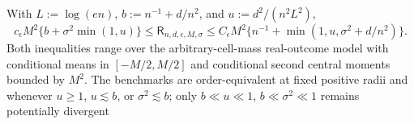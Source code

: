 With \(L:=\log(en)\), \(b:=n^{-1}+d/n^2\), and \(u:=d^2/(n^2L^2)\),
\[
 c_{\epsilon}M^2\{b+\sigma^2\min(1,u)\}
 \le\mathsf R_{n,d,\epsilon,M,\sigma}
 \le C_{\epsilon}M^2\{n^{-1}+\min(1,u,\sigma^2+d/n^2)\}.
\]
Both inequalities range over the arbitrary-cell-mass real-outcome model with conditional means in \([-M/2,M/2]\) and conditional second central moments bounded by \(M^2\).  The benchmarks are order-equivalent at fixed positive radii and whenever \(u\ge1\), \(u\lesssim b\), or \(\sigma^2\lesssim b\); only \(b\ll u\ll1\), \(b\ll\sigma^2\ll1\) remains potentially divergent
